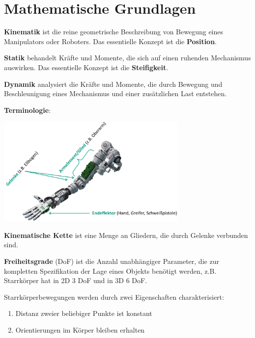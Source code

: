 \section{Mathematische Grundlagen}

\textbf{Kinematik} ist die reine geometrische Beschreibung von Bewegung eines Manipulators
oder Roboters. Das essentielle Konzept ist die \textbf{Position}.

\textbf{Statik} behandelt Kräfte und Momente, die sich auf einen ruhenden Mechanismus
auswirken. Das essentielle Konzept ist die \textbf{Steifigkeit}.

\textbf{Dynamik} analysiert die Kräfte und Momente, die durch Bewegung und Beschleunigung
eines Mechanismus und einer zusätzlichen Last entstehen.

\textbf{Terminologie}:
\begin{center}
	\includegraphics[width=0.7\textwidth]{images/arm.png}
\end{center}
\medskip
\textbf{Kinematische Kette} ist eine Menge an Gliedern, die durch Gelenke verbunden sind.

\textbf{Freiheitsgrade} (DoF) ist die Anzahl unabhängiger Parameter, die zur kompletten Spezifikation der Lage eines Objekts benötigt werden, z.B. Starrkörper hat in 2D 3 DoF und in 3D 6 DoF.

Starrkörperbewegungen werden durch zwei Eigenschaften charakterisiert:
\begin{enumerate}
	\item Distanz zweier beliebiger Punkte ist konstant
	\item Orientierungen im Körper bleiben erhalten
\end{enumerate}




